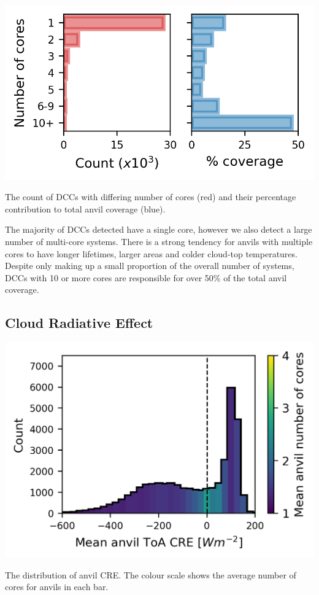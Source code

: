\documentclass{tufte-handout}
\begin{document}
\begin{marginfigure}%
  \includegraphics[width=0.95\linewidth]{figures/handout_coverage_figure.png}
  \caption{The count of DCCs with differing number of cores (red) and their percentage contribution to total anvil coverage (blue).}
  \label{fig:marginfig}
\end{marginfigure}

The majority of DCCs detected have a single core, however we also detect a large number of multi-core systems.
There is a strong tendency for anvils with multiple cores to have longer lifetimes, larger areas and colder cloud-top temperatures.
Despite only making up a small proportion of the overall number of systems, DCCs with 10 or more cores are responsible for over 50\% of the total anvil coverage.


\subsection{Cloud Radiative Effect}

\begin{marginfigure}[1\baselineskip]%
  \includegraphics[width=\linewidth]{figures/handout_fig4.png}
  \caption{The distribution of anvil CRE. The colour scale shows the average number of cores for anvils in each bar.}
  \label{fig:marginfig}
\end{marginfigure}
\end{document}
